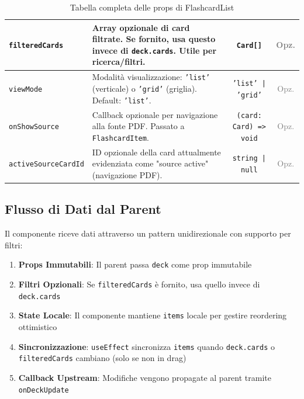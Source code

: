 \documentclass[11pt,a4paper]{article}
\begin{document}
\begin{table}[H]
\begin{tabularx}{\textwidth}{|l|X|c|c|}
\hline
\texttt{filteredCards} & Array opzionale di card filtrate. Se fornito, usa questo invece di \texttt{deck.cards}. Utile per ricerca/filtri. & \texttt{Card[]} & \textcolor{gray}{Opz.} \\
\hline
\texttt{viewMode} & Modalità visualizzazione: \texttt{'list'} (verticale) o \texttt{'grid'} (griglia). Default: \texttt{'list'}. & \texttt{'list' | 'grid'} & \textcolor{gray}{Opz.} \\
\hline
\texttt{onShowSource} & Callback opzionale per navigazione alla fonte PDF. Passato a \texttt{FlashcardItem}. & \texttt{(card: Card) => void} & \textcolor{gray}{Opz.} \\
\hline
\texttt{activeSourceCardId} & ID opzionale della card attualmente evidenziata come "source active" (navigazione PDF). & \texttt{string | null} & \textcolor{gray}{Opz.} \\
\hline
\end{tabularx}
\caption{Tabella completa delle props di FlashcardList}
\label{tab:props}
\end{table}

\subsection{Flusso di Dati dal Parent}

Il componente riceve dati attraverso un pattern unidirezionale con supporto per filtri:

\begin{enumerate}
    \item \textbf{Props Immutabili}: Il parent passa \texttt{deck} come prop immutabile
    \item \textbf{Filtri Opzionali}: Se \texttt{filteredCards} è fornito, usa quello invece di \texttt{deck.cards}
    \item \textbf{State Locale}: Il componente mantiene \texttt{items} locale per gestire reordering ottimistico
    \item \textbf{Sincronizzazione}: \texttt{useEffect} sincronizza \texttt{items} quando \texttt{deck.cards} o \texttt{filteredCards} cambiano (solo se non in drag)
    \item \textbf{Callback Upstream}: Modifiche vengono propagate al parent tramite \texttt{onDeckUpdate}
\end{enumerate}

\end{document}
